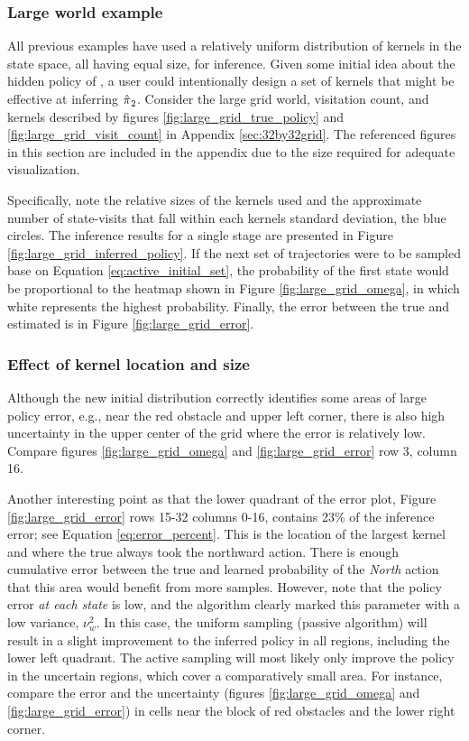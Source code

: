 \subsubsection{Large world example}

All previous examples have used a relatively uniform distribution of kernels in the state space, all having equal size,
for inference. Given some initial idea about the hidden policy of , a user could intentionally design a set of
kernels that might be effective at inferring $\hat{\pi_{}}_2$. Consider the large grid world, visitation count,
and kernels described by figures \ref{fig:large_grid_true_policy} and \ref{fig:large_grid_visit_count} in Appendix
\ref{sec:32by32grid}. The referenced figures in this section are included in the appendix due to the size required for
adequate visualization.

Specifically, note the relative sizes of the kernels used and the approximate number of state-visits that fall within
each kernels standard deviation, the blue circles. The inference results for a single stage are presented in Figure
\ref{fig:large_grid_inferred_policy}. If the next set of trajectories were to be sampled base on Equation
\ref{eq:active_initial_set}, the probability of the first state would be proportional to the heatmap shown in Figure
\ref{fig:large_grid_omega}, in which white represents the highest probability.  Finally, the error between the true and
estimated  is in Figure \ref{fig:large_grid_error}.

\subsubsection{Effect of kernel location and size}

Although the new initial distribution correctly identifies some areas of large policy error, e.g., near the red obstacle
and upper left corner, there is also high uncertainty in the upper center of the grid where the error is relatively low.
Compare figures \ref{fig:large_grid_omega} and \ref{fig:large_grid_error} row 3, column 16.

Another interesting point as that the lower quadrant of the error plot, Figure \ref{fig:large_grid_error} rows 15-32
columns 0-16, contains 23\% of the inference error; see  Equation \ref{eq:error_percent}. This is the location of the
largest kernel and where the true  always took the northward action. There is enough cumulative error between
the true and learned probability of the \emph{North} action that this area would benefit from more samples. However,
note that the policy error \emph{at each state} is low, and the algorithm clearly marked this parameter with a low
variance, $\nu_w^2$. In this case, the uniform sampling (passive algorithm) will result in a slight improvement to the
inferred policy in all regions, including the lower left quadrant. The active sampling will most likely only improve the
policy in the uncertain regions, which cover a comparatively small area. For instance, compare the error and the
uncertainty (figures \ref{fig:large_grid_omega} and \ref{fig:large_grid_error}) in cells near the block of red obstacles
and the lower right corner.

